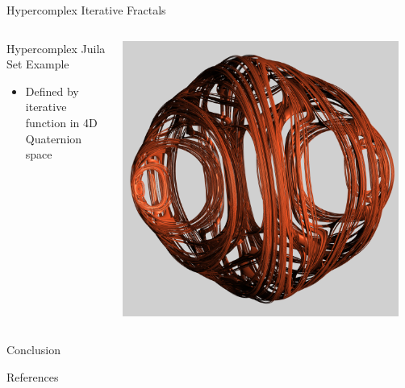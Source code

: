 \documentclass[aspectratio=169,t]{beamer}
\begin{document}
\begin{frame}[label={sec:org5d951ac}]{Hypercomplex Iterative Fractals}
\begin{columns}
\begin{column}{0.55\columnwidth}
\begin{block}{Hypercomplex Juila Set Example}
\begin{itemize}
\item Defined by iterative function in 4D Quaternion space
\end{itemize}
\end{block}
\end{column}

\begin{column}{0.45\columnwidth}
\begin{center}
\includegraphics[width=0.95\textwidth]{./Figs/Fig_1v2.png}
\end{center}
\end{column}
\end{columns}
\end{frame}

\begin{frame}[label={sec:orga157e88}]{Conclusion}
\end{frame}

\begin{frame}[allowframebreaks,label=]{References}
\nocite{*}


\end{frame}
\end{document}
